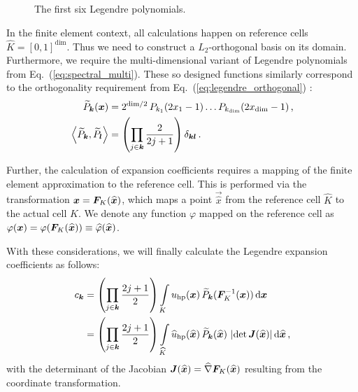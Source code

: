 \begin{figure}
\centering

\caption{The first six Legendre polynomials.}
\label{fig:legendre}
\end{figure}

In the finite element context, all calculations happen on reference cells $\widehat{K} = [0,1]^\text{dim}$. Thus we need to construct a $L_2$-orthogonal basis on its domain. Furthermore, we require the multi-dimensional variant of Legendre polynomials from Eq.~(\ref{eq:spectral_multi}). These so designed functions similarly correspond to the orthogonality requirement from Eq.~(\ref{eq:legendre_orthogonal}) \textcite{dealiilegendre}:
\begin{align}
\widetilde{P}_\tuple{k}(\vec{x}) &= 2^{\text{dim}/2} \, P_{k_1}(2x_1 - 1) \dots P_{k_\text{dim}}(2x_\text{dim} - 1) \,\text{,} \\
\left\langle \widetilde{P}_\tuple{k}, \widetilde{P}_\tuple{l} \right\rangle &= \left(\prod\limits_{j \in \tuple{k}} \frac{2}{2j+1}\right) \delta_{\tuple{k} \tuple{l}} \,\text{.}
\end{align}

Further, the calculation of expansion coefficients requires a mapping of the finite element approximation to the reference cell. This is performed via the transformation $\vec{x} = \mat{F}_K(\vec{\widehat{x}})$, which maps a point $\vec{\widehat{x}}$ from the reference cell $\widehat{K}$ to the actual cell $K$. We denote any function $\varphi$ mapped on the reference cell as $\varphi(\vec{x}) = \varphi(\mat{F}_K(\vec{\widehat{x}})) \equiv \widehat{\varphi}(\vec{\widehat{x}})$. \textcite{dealiimapping}

With these considerations, we will finally calculate the Legendre expansion coefficients as follows:
\begin{align}
c_\tuple{k} &=
\left(\prod\limits_{j \in \tuple{k}} \frac{2j+1}{2}\right) \int\limits_{K} u_\text{hp}(\vec{x}) \, \widetilde{P}_\tuple{k}(\mat{F}_K^{-1}(\vec{x})) \differential{\vec{x}} \\
&= \left(\prod\limits_{j \in \tuple{k}} \frac{2j+1}{2}\right) \int\limits_{\widehat{K}} \widehat{u}_\text{hp}(\vec{\widehat{x}}) \, \widetilde{P}_\tuple{k}(\vec{\widehat{x}}) \, \left|\det \mat{J}(\vec{\widehat{x}})\right| \differential{\vec{\widehat{x}}} \,\text{,}
\end{align}
with the determinant of the Jacobian $\mat{J}(\vec{\widehat{x}}) = \widehat{\nabla} \mat{F}_K (\vec{\widehat{x}})$ resulting from the coordinate transformation. \textcite{dealiilegendre}

